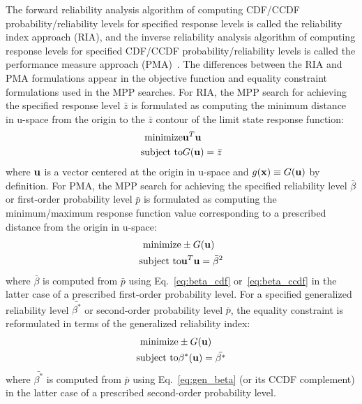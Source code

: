 The forward reliability analysis algorithm of computing CDF/CCDF
probability/reliability levels for specified response levels is called
the reliability index approach (RIA), and the inverse reliability
analysis algorithm of computing response levels for specified CDF/CCDF
probability/reliability levels is called the performance measure
approach (PMA)~\cite{Tu99}.  The differences between the RIA and PMA
formulations appear in the objective function and equality constraint
formulations used in the MPP searches.  For RIA, the MPP search for
achieving the specified response level $\bar{z}$ is formulated as
computing the minimum distance in u-space from the origin to the
$\bar{z}$ contour of the limit state response function:
\begin{eqnarray}
{\rm minimize}     & {\bf u}^T {\bf u} \nonumber \\
{\rm subject \ to} & G({\bf u}) = \bar{z} \label{eq:ria_opt}
\end{eqnarray}
where ${\bf u}$ is a vector centered at the origin in u-space and
$g({\bf x}) \equiv G({\bf u})$ by definition.  For PMA, the MPP search
for achieving the specified reliability level $\bar{\beta}$ or
first-order probability level $\bar{p}$ is formulated as computing the
minimum/maximum response function value corresponding to a prescribed
distance from the origin in u-space:
\begin{eqnarray}
{\rm minimize}     & \pm G({\bf u}) \nonumber \\
{\rm subject \ to} & {\bf u}^T {\bf u} = \bar{\beta}^2 \label{eq:pma_opt}
\end{eqnarray}
where $\bar{\beta}$ is computed from $\bar{p}$ using
Eq.~\ref{eq:beta_cdf} or~\ref{eq:beta_ccdf} in the latter case of a
prescribed first-order probability level.  For a specified generalized
reliability level $\bar{\beta^*}$ or second-order probability level
$\bar{p}$, the equality constraint is reformulated in terms of the
generalized reliability index:
\begin{eqnarray}
{\rm minimize}     & \pm G({\bf u}) \nonumber \\
{\rm subject \ to} & \beta^*({\bf u}) = \bar{\beta^*} \label{eq:pma2_opt}
\end{eqnarray}
where $\bar{\beta^*}$ is computed from $\bar{p}$ using
Eq.~\ref{eq:gen_beta} (or its CCDF complement) in the latter case of a
prescribed second-order probability level.

